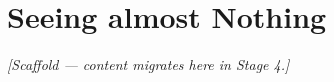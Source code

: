\chapter{Seeing almost Nothing}
\label{chap:almostnothing}


\noindent\emph{[Scaffold --- content migrates here in Stage 4.]}
